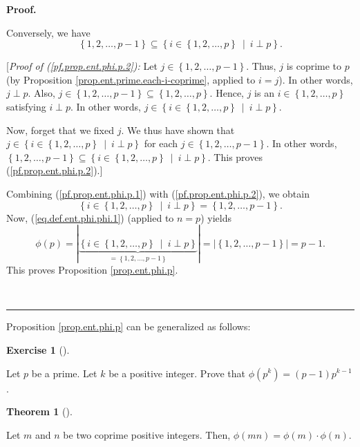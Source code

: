 \documentclass[numbers=enddot,12pt,final,onecolumn,notitlepage]{scrartcl}%
\newcounter{exer}
\numberwithin{exer}{subsection}
\theoremstyle{definition}
\newtheorem{theo}{Theorem}[subsection]
\newenvironment{theorem}[1][]
{\begin{theo}[#1]\begin{leftbar}}
{\end{leftbar}\end{theo}}
\newtheorem{exmp}[exer]{Exercise}
\newenvironment{exercise}[1][]
{\begin{exmp}[#1]\begin{leftbar}}
{\end{leftbar}\end{exmp}}
\newenvironment{fineprint}{\begin{small}}{\end{small}}
\newenvironment{proof}[1][Proof]{\noindent\textbf{#1.} }{\ \rule{0.5em}{0.5em}}
\begin{document}
\begin{proof}
\begin{fineprint}
Conversely, we have%
\begin{equation}
\left\{  1,2,\ldots,p-1\right\}  \subseteq\left\{  i\in\left\{  1,2,\ldots
,p\right\}  \ \mid\ i\perp p\right\}  . \label{pf.prop.ent.phi.p.2}%
\end{equation}


[\textit{Proof of (\ref{pf.prop.ent.phi.p.2}):} Let $j\in\left\{
1,2,\ldots,p-1\right\}  $. Thus, $j$ is coprime to $p$ (by Proposition
\ref{prop.ent.prime.each-i-coprime}, applied to $i=j$). In other words,
$j\perp p$. Also, $j\in\left\{  1,2,\ldots,p-1\right\}  \subseteq\left\{
1,2,\ldots,p\right\}  $. Hence, $j$ is an $i\in\left\{  1,2,\ldots,p\right\}
$ satisfying $i\perp p$. In other words, $j\in\left\{  i\in\left\{
1,2,\ldots,p\right\}  \ \mid\ i\perp p\right\}  $.

Now, forget that we fixed $j$. We thus have shown that $j\in\left\{
i\in\left\{  1,2,\ldots,p\right\}  \ \mid\ i\perp p\right\}  $ for each
$j\in\left\{  1,2,\ldots,p-1\right\}  $. In other words, $\left\{
1,2,\ldots,p-1\right\}  \subseteq\left\{  i\in\left\{  1,2,\ldots,p\right\}
\ \mid\ i\perp p\right\}  $. This proves (\ref{pf.prop.ent.phi.p.2}).]

Combining (\ref{pf.prop.ent.phi.p.1}) with (\ref{pf.prop.ent.phi.p.2}), we
obtain%
\[
\left\{  i\in\left\{  1,2,\ldots,p\right\}  \ \mid\ i\perp p\right\}
=\left\{  1,2,\ldots,p-1\right\}  .
\]
Now, (\ref{eq.def.ent.phi.phi.1}) (applied to $n=p$) yields%
\[
\phi\left(  p\right)  =\left\vert \underbrace{\left\{  i\in\left\{
1,2,\ldots,p\right\}  \ \mid\ i\perp p\right\}  }_{=\left\{  1,2,\ldots
,p-1\right\}  }\right\vert =\left\vert \left\{  1,2,\ldots,p-1\right\}
\right\vert =p-1.
\]
This proves Proposition \ref{prop.ent.phi.p}.
\end{fineprint}
\end{proof}

Proposition \ref{prop.ent.phi.p} can be generalized as follows:

\begin{exercise}
\label{exe.ent.phi.pk}Let $p$ be a prime. Let $k$ be a positive integer. Prove
that $\phi\left(  p^{k}\right)  =\left(  p-1\right)  p^{k-1}$.
\end{exercise}

\begin{theorem}
\label{thm.ent.phi.mult}Let $m$ and $n$ be two coprime positive integers.
Then, $\phi\left(  mn\right)  =\phi\left(  m\right)  \cdot\phi\left(
n\right)  $.
\end{theorem}
\end{document}

